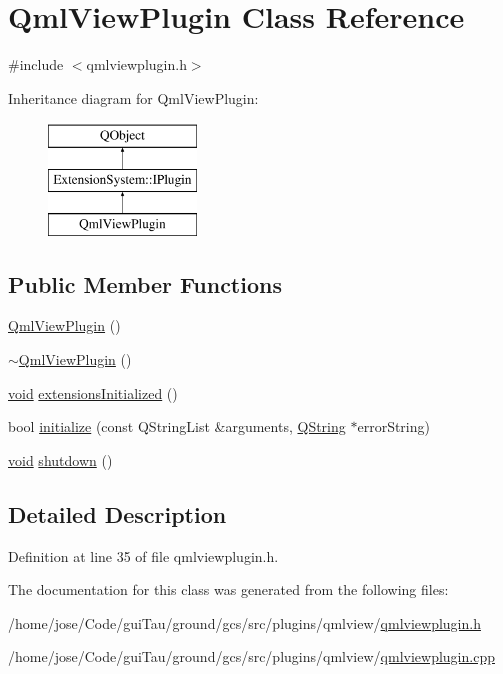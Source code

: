 \hypertarget{class_qml_view_plugin}{\section{Qml\-View\-Plugin Class Reference}
\label{class_qml_view_plugin}
}


{\ttfamily \#include $<$qmlviewplugin.\-h$>$}

Inheritance diagram for Qml\-View\-Plugin\-:\begin{figure}[H]
\begin{center}
\leavevmode
\includegraphics[height=3.000000cm]{class_qml_view_plugin}
\end{center}
\end{figure}
\subsection*{Public Member Functions}
\begin{DoxyCompactItemize}
\item 
\hyperlink{group___o_p_map_plugin_ga1276ad345027c9b33c40edc2e447dd98}{Qml\-View\-Plugin} ()
\item 
\hyperlink{group___o_p_map_plugin_gab669bd345bdb7a755f4f767edf44f5fc}{$\sim$\-Qml\-View\-Plugin} ()
\item 
\hyperlink{group___u_a_v_objects_plugin_ga444cf2ff3f0ecbe028adce838d373f5c}{void} \hyperlink{group___o_p_map_plugin_ga36fa5cb525a31c9b6877a3da80262f69}{extensions\-Initialized} ()
\item 
bool \hyperlink{group___o_p_map_plugin_ga07810591116e8f592fca15a0fe4e3b1d}{initialize} (const Q\-String\-List \&arguments, \hyperlink{group___u_a_v_objects_plugin_gab9d252f49c333c94a72f97ce3105a32d}{Q\-String} $\ast$error\-String)
\item 
\hyperlink{group___u_a_v_objects_plugin_ga444cf2ff3f0ecbe028adce838d373f5c}{void} \hyperlink{group___o_p_map_plugin_ga181dc94c5cc23521ffde448715c6ad8e}{shutdown} ()
\end{DoxyCompactItemize}


\subsection{Detailed Description}


Definition at line 35 of file qmlviewplugin.\-h.



The documentation for this class was generated from the following files\-:\begin{DoxyCompactItemize}
\item 
/home/jose/\-Code/gui\-Tau/ground/gcs/src/plugins/qmlview/\hyperlink{qmlviewplugin_8h}{qmlviewplugin.\-h}\item 
/home/jose/\-Code/gui\-Tau/ground/gcs/src/plugins/qmlview/\hyperlink{qmlviewplugin_8cpp}{qmlviewplugin.\-cpp}\end{DoxyCompactItemize}
